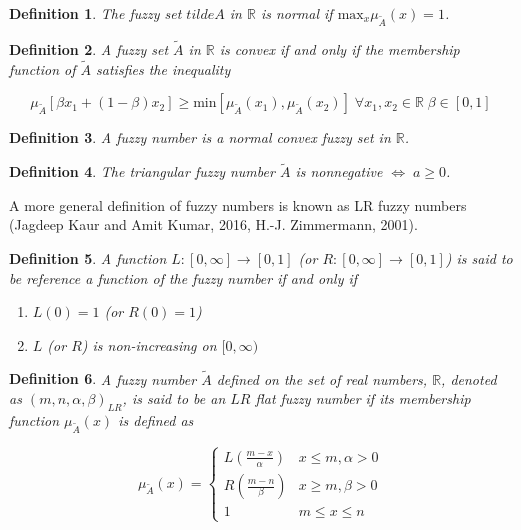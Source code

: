 \documentclass[11pt,a4paper,final]{article}
\newtheorem{definition}{Definition}[section]
\begin{document}
\begin{definition}
The fuzzy set \(tilde{A}\) in \(\mathbb{R}\) is normal if \(\text{max}_x \mu_{\tilde{A}}(x) = 1\).
\end{definition}

\begin{definition}
A fuzzy set \(\tilde{A}\) in \(\mathbb{R}\) is convex if and only if the membership function of \(\tilde{A}\) satisfies the inequality

\begin{equation*}
\mu_{\tilde{A}}[\beta x_1 + (1-\beta)x_2] \ge \text{min}[\mu_{\tilde{A}}(x_1), \mu_{\tilde{A}}(x_2)]\; \forall x_1, x_2 \in \mathbb{R}\; \beta \in [0,1]
\end{equation*}
\end{definition}

\begin{definition}
A fuzzy number is a normal convex fuzzy set in \(\mathbb{R}\).
\end{definition}

\begin{definition}
The triangular fuzzy number \(\tilde{A}\) is nonnegative \(\iff\; a \ge 0\).
\end{definition}

A more general definition of fuzzy numbers is known as LR fuzzy numbers
(Jagdeep Kaur and Amit Kumar, 2016, H.-J. Zimmermann, 2001).

\begin{definition}
A function \(L:[0,\infty] \rightarrow [0,1]\) (or \(R:[0,\infty] \rightarrow [0,1]\)) is said to be reference a function of the fuzzy number if and only
if

\begin{enumerate}
\item \(L(0) = 1\) (or \(R(0) = 1\))
\item \(L\) (or \(R\)) is non-increasing on \([0,\infty)\)
\end{enumerate}
\end{definition}

\begin{definition}
A fuzzy number \(\tilde{A}\) defined on the set of real numbers, \(\mathbb{R}\), denoted as \((m,n,\alpha,\beta)_{LR}\), is said to be an \(LR\)
flat fuzzy number if its membership function \(\mu_{\tilde{A}}(x)\) is defined as

\begin{equation}
\mu_{\tilde{A}}(x) =
\begin{cases}
L(\frac{m-x}{\alpha}) & x \le m, \alpha > 0 \\
R(\frac{m-n}{\beta}) & x \ge m, \beta > 0 \\
1                & m \le x \le n
\end{cases}
\end{equation}
\end{definition}
\end{document}
